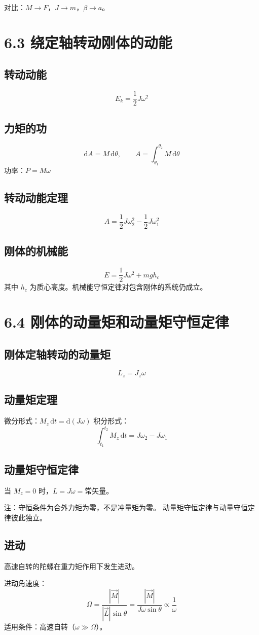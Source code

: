 \documentclass{ctexart}
\begin{document}
对比：$M \to F$，$J \to m$，$\beta \to a$。

\section*{6.3 绕定轴转动刚体的动能}

\subsection*{转动动能}
\[
E_k = \frac12 J\omega^{2}
\]

\subsection*{力矩的功}
\[
\mathrm{d}A = M\,\mathrm{d}\theta,\qquad
A = \int_{\theta_1}^{\theta_2} M\,\mathrm{d}\theta
\]
功率：$P = M\omega$

\subsection*{转动动能定理}
\[
A = \frac12 J\omega_2^{2} - \frac12 J\omega_1^{2}
\]

\subsection*{刚体的机械能}
\[
E = \frac12 J\omega^{2} + mgh_c
\]
其中 $h_c$ 为质心高度。机械能守恒定律对包含刚体的系统仍成立。

\section*{6.4 刚体的动量矩和动量矩守恒定律}

\subsection*{刚体定轴转动的动量矩}
\[
L_z = J_z\omega
\]

\subsection*{动量矩定理}
微分形式：$M_z\,\mathrm{d}t = \mathrm{d}(J\omega)$
积分形式：
\[
\int_{t_1}^{t_2} M_z\,\mathrm{d}t = J\omega_2 - J\omega_1
\]

\subsection*{动量矩守恒定律}
当 $M_z = 0$ 时，$L = J\omega = \text{常矢量}$。

注：守恒条件为合外力矩为零，不是冲量矩为零。
动量矩守恒定律与动量守恒定律彼此独立。

\subsection*{进动}
高速自转的陀螺在重力矩作用下发生进动。

进动角速度：
\[
\Omega = \frac{|\vec{M}|}{|\vec{L}|\sin\theta} = \frac{|\vec{M}|}{J\omega\sin\theta} \propto \frac{1}{\omega}
\]
适用条件：高速自转（$\omega \gg \Omega$）。
\end{document}
